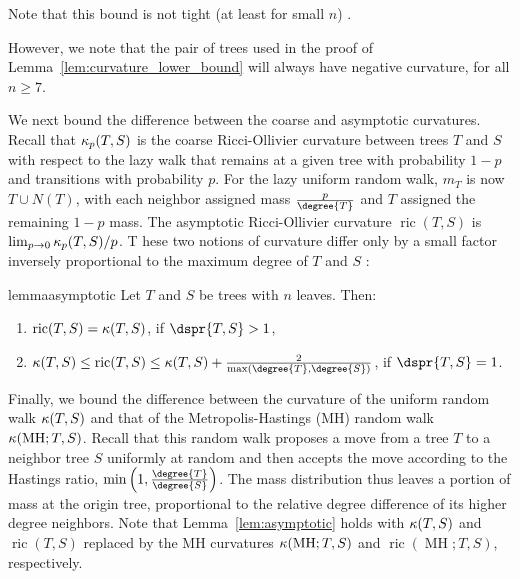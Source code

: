 \documentclass[11pt,onecolumn,conference]{IEEEtran}
\newcommand{\MH}{\operatorname{MH}}
\newcommand{\cuttable}[2][]{%
    \ifthenelse{\equal{#1}{}}%
		{}%
		{#1}%
}
\newcommand{\curvature}[2][]{%
    \ifthenelse{\equal{#1}{}}%
		{\kappa(#2)}%
		{\kappa_{#1}(#2)}%
}
\newcommand{\ric}[1]{
	\operatorname{ric}(#1)%
}
\begin{document}
Note that this bound is not tight (at least for small $n$)\cuttable{ as it is rarely necessary to transport mass the maximum distance between unpaired trees}.
\cuttable{We also note that the lower bounds in this section do not follow from the more general setting described in \cite{Jost2013-ce}.}
However, we note that the pair of trees used in the proof of Lemma~\ref{lem:curvature_lower_bound} will always have negative curvature, for all $n \ge 7$.

We next bound the difference between the coarse and asymptotic curvatures.
Recall that $\curvature[p]{T,S}$ is the coarse Ricci-Ollivier curvature between trees $T$ and $S$ with respect to the lazy walk that remains at a given tree with probability $1-p$ and transitions with probability $p$.
For the lazy uniform random walk, $m_T$ is now $T \cup N(T)$, with each neighbor assigned mass $\frac{p}{\degree{T}}$ and $T$ assigned the remaining $1 - p$ mass.
The asymptotic Ricci-Ollivier curvature $\ric{T,S}$ is $\lim_{p \rightarrow 0} \curvature[p]{T,S} / p$.
\cuttable[T]{As we now prove, t}hese two notions of curvature differ only by a small factor inversely proportional to the maximum degree of $T$ and $S$\cuttable[:]{.}

\begin{restatable}{lemma}{asymptotic}
\label{lem:asymptotic}
	Let $T$ and $S$ be trees with $n$ leaves.
	Then:
	\begin{enumerate}
		\item	$\ric{T,S} = \curvature{T,S}$, if $\dspr{T,S} > 1$,
		\item	$\curvature{T,S} \le \ric{T,S} \le \curvature{T,S} + \frac{2}{\max(\degree{T}, \degree{S})}$, if $\dspr{T,S} = 1$.
	\end{enumerate}
\end{restatable}


Finally, we bound the difference between the curvature of the uniform random walk $\curvature{T,S}$ and that of the Metropolis-Hastings (MH) random walk $\curvature{\MH; T,S}$.
Recall that this random walk proposes a move from a tree $T$ to a neighbor tree $S$ uniformly at random and then accepts the move according to the Hastings ratio, \cuttable{which in this case is }$\min\left(1, \frac{\degree{T}}{\degree{S}}\right)$.
The mass distribution \cuttable{for the MH random walk }thus leaves a portion of mass at the origin tree, proportional to the relative degree difference of its higher degree neighbors.
Note that \cuttable{the same statement and proof of }Lemma~\ref{lem:asymptotic} holds with $\curvature{T,S}$ and $\ric{T,S}$ replaced by the MH curvatures $\curvature{\MH; T,S}$ and $\ric{\MH; T,S}$, respectively.
\end{document}
